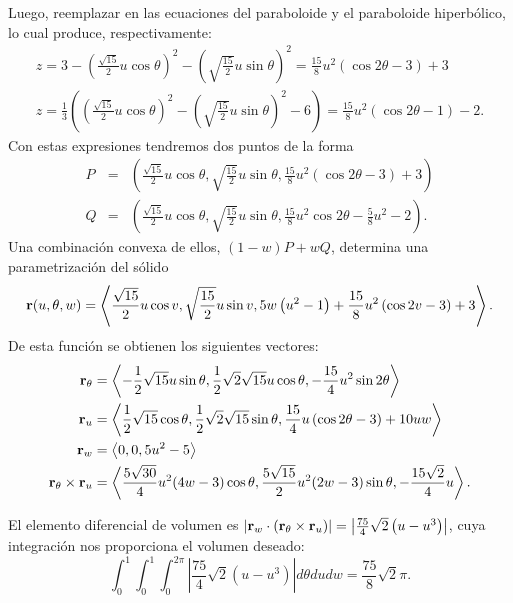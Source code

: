 \begin{parrafonumerado}
Luego, reemplazar en las ecuaciones del paraboloide y el paraboloide hiperbólico, lo cual produce, respectivamente:
\begin{gather*}
z = 3-\left( \frac{\sqrt{15}}{2}u\cos \theta \right) ^2 -\left( \sqrt{\frac{15}{2}}u\sin \theta \right) ^2  = \frac{15}{8}u^{2}(\cos 2\theta -3)+3 \\
z =  \frac{1}{3}\left( \left( \frac{\sqrt{15}}{2}u\cos \theta \right)^2-\left( \sqrt{\frac{15}{2}}u\sin \theta \right) ^2 -6\right) =  \frac{15}{8}u^{2}(\cos 2\theta -1)-2.
\end{gather*}
Con estas expresiones tendremos dos puntos de la forma
\begin{eqnarray*}
P& =&\left( \frac{\sqrt{15}}{2}u\cos \theta,\sqrt{\frac{15}{2}}u\sin \theta , \frac{15}{8}u^{2}(\cos 2\theta -3)+3\right) \\
Q&=&\left( \frac{\sqrt{15}}{2}u\cos \theta,\sqrt{\frac{15}{2}}u\sin \theta,\frac{15}{8}u^{2}\cos 2\theta-\frac{5}{8}u^{2}-2\right).
\end{eqnarray*}
Una combinación convexa de ellos, $(1-w)P+wQ$, determina una parametrización del sólido
\begin{gather*}
{\bf r}(u,\theta,w) = \left\langle \frac{\sqrt{15}}{2}u\cos v,\sqrt{\frac{15}{2}}u\sin v,5w\left( u^{2}-1\right) +\frac{15}{8}u^{2}\left(\cos2v-3\right) +3 \right\rangle.
\end{gather*}
De esta función se obtienen los siguientes vectores:
\begin{align*}
{\bf r}_{\theta } &= \left\langle -\frac{1}{2}\sqrt{15}u\sin \theta ,\frac{1}{2}%
\sqrt{2}\sqrt{15}u\cos \theta ,-\frac{15}{4}u^{2}\sin 2\theta \right\rangle \\
{\bf r}_{u} &= \left\langle \frac{1}{2}\sqrt{15}\cos \theta ,\frac{1}{2}\sqrt{2} \sqrt{15}\sin \theta ,\frac{15}{4}u\left( \cos 2\theta -3\right) +10uw \right\rangle \\
{\bf r}_{w} &= \left\langle 0,0,5u^{2}-5\right\rangle \\
{\bf r}_{\theta }\times {\bf r}_{u} &= \left\langle \frac{5\sqrt{30}}{4} u^{2} (4w-3) \cos \theta ,\frac{5\sqrt{15}}{2}u^{2}(2w-3) \sin \theta ,-\frac{15\sqrt{2}}{4}u \right\rangle.
\end{align*}

El elemento diferencial de volumen es
$\left\vert {\bf r}_{w}\cdot \left({\bf r}_{\theta }\times {\bf r}_{u}\right) \right\vert
=  \left\vert \frac{75}{4}\sqrt{2}\left( u-u^{3}\right) \right\vert $,
cuya integración nos proporciona el volumen deseado:
$$\int_{0}^{1}\int_{0}^{1}\int_{0}^{2\pi }\left\vert \frac{75}{4}\sqrt{2}\left( u-u^{3}\right) \right\vert d\theta dudw
= \frac{75}{8}\sqrt{2}\pi .$$


\end{parrafonumerado}
